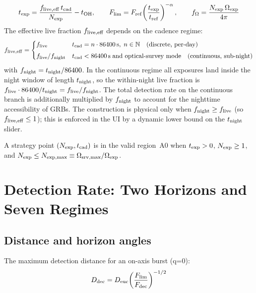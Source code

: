 \documentclass[11pt,a4paper]{article}
\begin{document}
\begin{equation}
t_{\rm exp} = \frac{f_{\rm live,eff}\,t_{\rm cad}}{N_{\rm exp}} - t_{\rm OH},\qquad
F_{\rm lim} = F_{\rm ref}\!\left(\frac{t_{\rm exp}}{t_{\rm ref}}\right)^{-\alpha},\qquad
f_\Omega = \frac{N_{\rm exp}\,\Omega_{\rm exp}}{4\pi}
\end{equation}
The effective live fraction $f_{\rm live,eff}$ depends on the cadence regime:
\[
f_{\rm live,eff} = \begin{cases}
f_{\rm live} & t_{\rm cad} = n\cdot 86400\,\text{s},\; n\in\mathbb{N}\quad\text{(discrete, per-day)}\\[4pt]
f_{\rm live}/f_{\rm night} & t_{\rm cad} < 86400\,\text{s}\;\text{and optical-survey mode}\quad\text{(continuous, sub-night)}
\end{cases}
\]
with $f_{\rm night}=t_{\rm night}/86400$. In the continuous regime all exposures land inside the night window of length $t_{\rm night}$, so the within-night live fraction is $f_{\rm live}\cdot 86400/t_{\rm night}=f_{\rm live}/f_{\rm night}$. The total detection rate on the continuous branch is additionally multiplied by $f_{\rm night}$ to account for the nighttime accessibility of GRBs. The construction is physical only when $f_{\rm night}\ge f_{\rm live}$ (so $f_{\rm live,eff}\le 1$); this is enforced in the UI by a dynamic lower bound on the $t_{\rm night}$ slider.

A strategy point $(N_{\rm exp},t_{\rm cad})$ is in the valid region~A0 when $t_{\rm exp}>0$, $N_{\rm exp}\ge1$, and $N_{\rm exp}\le N_{\rm exp,max}\equiv\Omega_{\rm srv,max}/\Omega_{\rm exp}$.

\section{Detection Rate: Two Horizons and Seven Regimes}

\subsection{Distance and horizon angles}

\noindent The maximum detection distance for an on-axis burst (q=0):
\begin{equation}
D_{\rm dec} = D_{\rm euc}\!\left(\frac{F_{\rm lim}}{F_{\rm dec}}\right)^{-1/2}
\end{equation}
\end{document}
